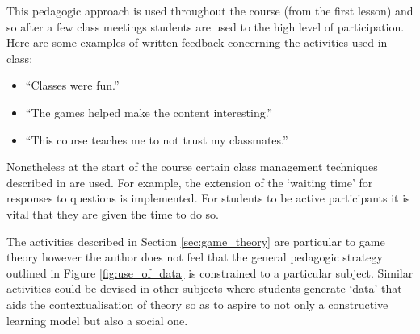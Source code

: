 \documentclass[12pt, a4paper]{article}
\begin{document}
This pedagogic approach is used throughout the course (from the first lesson)
and so after a few class meetings students are used to the high level of
participation. Here are some examples of written feedback concerning the
activities used in class:

\begin{itemize}
    \item ``Classes were fun.''
    \item ``The games helped make the content interesting.''
    \item ``This course teaches me to not trust my classmates.''
\end{itemize}

Nonetheless at the start of the course certain class management techniques
described in \cite{Rocca2010} are used. For example, the extension of the
`waiting time' for responses to questions is implemented. For students to be
active participants it is vital that they are given the time to do so.


The activities described in Section \ref{sec:game_theory} are particular to game
theory however the author does not feel that the general pedagogic strategy
outlined in Figure \ref{fig:use_of_data} is constrained to a particular subject.
Similar activities could be devised in other subjects where students generate
`data' that aids the contextualisation of theory so as to aspire to not only a
constructive learning model but also a social one.

\printbibliography
\end{document}
